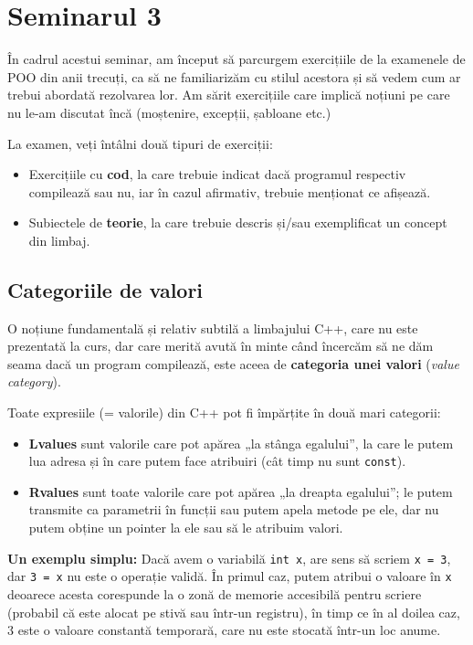 \section*{Seminarul 3}

În cadrul acestui seminar, am început să parcurgem exercițiile de la examenele de POO din anii trecuți, ca să ne familiarizăm cu stilul acestora și să vedem cum ar trebui abordată rezolvarea lor. Am sărit exercițiile care implică noțiuni pe care nu le-am discutat încă (moștenire, excepții, șabloane etc.)

La examen, veți întâlni două tipuri de exerciții:
\begin{itemize}
    \item Exercițiile cu \textbf{cod}, la care trebuie indicat dacă programul respectiv compilează sau nu, iar în cazul afirmativ, trebuie menționat ce afișează.
    \item Subiectele de \textbf{teorie}, la care trebuie descris și/sau exemplificat un concept din limbaj.
\end{itemize} 

\subsection*{Categoriile de valori}

O noțiune fundamentală și relativ subtilă a limbajului C++, care nu este prezentată la curs, dar care merită avută în minte când încercăm să ne dăm seama dacă un program compilează, este aceea de \textbf{categoria unei valori} (\textit{value category}).

Toate expresiile (= valorile) din C++ pot fi împărțite în două mari categorii:
\begin{itemize}
    \item \textbf{Lvalues} sunt valorile care pot apărea „la stânga egalului”, la care le putem lua adresa și în care putem face atribuiri (cât timp nu sunt \texttt{const}).
    \item \textbf{Rvalues} sunt toate valorile care pot apărea „la dreapta egalului”; le putem transmite ca parametrii în funcții sau putem apela metode pe ele, dar nu putem obține un pointer la ele sau să le atribuim valori. 
\end{itemize}

\textbf{Un exemplu simplu:} Dacă avem o variabilă \texttt{int x}, are sens să scriem \texttt{x = 3}, dar \texttt{3 = x} nu este o operație validă. În primul caz, putem atribui o valoare în \texttt{x} deoarece acesta corespunde la o zonă de memorie accesibilă pentru scriere (probabil că este alocat pe stivă sau într-un registru), în timp ce în al doilea caz, \(3\) este o valoare constantă temporară, care nu este stocată într-un loc anume.


